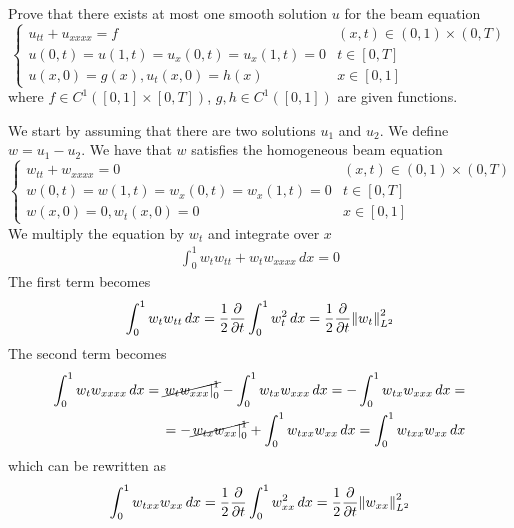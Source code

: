 \newpage
\begin{exercise}
    Prove that there exists at most one smooth solution \(u\) for the beam equation
    \[
        \begin{cases}
            u_{tt} + u_{xxxx} = f                         & (x,t) \in (0,1) \times (0, T) \\
            u(0, t) = u(1, t) = u_x(0, t) = u_x(1, t) = 0 & t \in [0, T]                  \\
            u(x, 0) = g(x), u_t(x, 0) = h(x)              & x \in [0, 1]
        \end{cases}
        \tag*{(P)}
    \]
    where \(f \in C^1([0,1] \times [0, T])\), \(g, h \in C^1([0,1])\) are given
    functions.
\end{exercise}

We start by assuming that there are two solutions \(u_1\) and \(u_2\). We
define \(w = u_1 - u_2\). We have that \(w\) satisfies the homogeneous beam
equation
\[
    \begin{cases}
        w_{tt} + w_{xxxx} = 0                         & (x,t) \in (0,1) \times (0, T) \\
        w(0, t) = w(1, t) = w_x(0, t) = w_x(1, t) = 0 & t \in [0, T]                  \\
        w(x, 0) = 0, w_t(x, 0) = 0                    & x \in [0, 1]
    \end{cases}
\]
We multiply the equation by \(w_t\) and integrate over \(x\)
\[
    \begin{split}
        \int_0^1 w_t w_{tt} + w_t w_{xxxx} \, dx = 0
    \end{split}
\]
The first term becomes
\[
    \begin{split}
        \int_0^1 w_t w_{tt} \, dx = \frac{1}{2} \frac{\partial}{\partial t} \int_0^1 w_t^2 \, dx = \frac{1}{2} \frac{\partial}{\partial t} \norm{w_t}_{L^2}^2
    \end{split}
\]
The second term becomes
\[
    \begin{split}
        \int_0^1 w_t w_{xxxx} \, dx = \cancel{\left. w_t w_{xxx} \right|_0^1} - \int_0^1 w_{tx} w_{xxx} \, dx = - \int_0^1 w_{tx} w_{xxx} \, dx = \\
        = -\cancel{\left. w_{tx} w_{xx} \right|_0^1} + \int_0^1 w_{txx} w_{xx} \, dx = \int_0^1 w_{txx} w_{xx} \, dx
    \end{split}
\]
which can be rewritten as
\[
    \begin{split}
        \int_0^1 w_{txx} w_{xx} \, dx = \frac{1}{2} \frac{\partial}{\partial t} \int_0^1 w_{xx}^2 \, dx = \frac{1}{2} \frac{\partial}{\partial t} \norm{w_{xx}}_{L^2}^2
    \end{split}
\]
